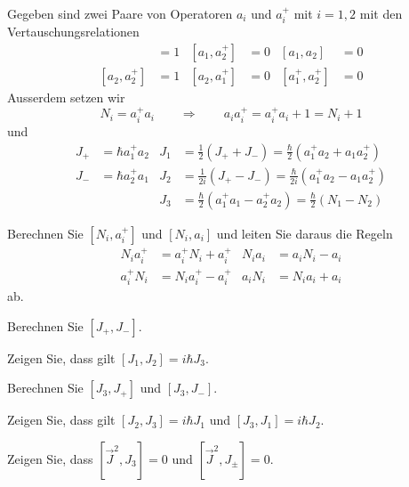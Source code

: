 Gegeben sind zwei Paare von Operatoren $a_i$ und $a_i^+$ mit $i=1,2$
mit den Vertauschungsrelationen
\begin{align*}
[a_1,a_1^+]&=1&[a_1,a_2^+]&=0&[a_1,a_2]&=0\\
[a_2,a_2^+]&=1&[a_2,a_1^+]&=0&[a_1^+,a_2^+]&=0
\end{align*}
Ausserdem setzen wir 
\[
N_i=a_i^+a_i
\qquad
\Rightarrow
\qquad
a_ia_i^+=a_i^+a_i+1=N_i+1
\]
und
\begin{align*}
J_+
&=
\hbar a_1^+a_2
&
J_1
&=
\frac12(J_++J_-)
=
\frac{\hbar}2(a_1^+a_2+a_1a_2^+)
\\
J_-
&=
\hbar a_2^+a_1
&
J_2
&=
\frac1{2i}(J_+-J_-)
=
\frac{\hbar}{2i}(a_1^+a_2-a_1a_2^+)
\\
&&
J_3
&=
\frac{\hbar}2(a_1^+a_1-a_2^+a_2)
=
\frac{\hbar}2(N_1-N_2)
\end{align*}
\begin{teilaufgaben}
\item Berechnen Sie $[N_i,a_i^+]$ und $[N_i,a_i]$ und leiten Sie daraus
die Regeln
\begin{align*}
N_ia_i^+&= a_i^+ N_i + a_i^+
&
N_ia_i  &= a_i   N_i - a_i
\\
a_i^+N_i&= N_ia_i^+ - a_i^+
&
a_i N_i  &= N_i a_i   + a_i
\end{align*}
ab.
\item Berechnen Sie $[J_+,J_-]$.
\item Zeigen Sie, dass gilt $[J_1,J_2]=i\hbar J_3$.
\item Berechnen Sie $[J_3,J_+]$ und $[J_3,J_-]$.
\item Zeigen Sie, dass gilt $[J_2,J_3]=i\hbar J_1$ und $[J_3,J_1]=i\hbar J_2$.
\item Zeigen Sie, dass $[\vec J^2, J_3]=0$ und $[\vec J^2,J_\pm]=0$.
\end{teilaufgaben}

